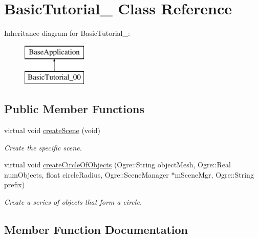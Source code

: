\hypertarget{class_basic_tutorial__00}{}\section{Basic\+Tutorial\+\_ Class Reference}
\label{class_basic_tutorial__00}
Inheritance diagram for Basic\+Tutorial\+\_\+:\begin{figure}[H]
\begin{center}
\leavevmode
\includegraphics[height=2.000000cm]{class_basic_tutorial__00}
\end{center}
\end{figure}
\subsection*{Public Member Functions}
\begin{DoxyCompactItemize}
\item 
virtual void \hyperlink{class_basic_tutorial__00_a15a3d4673724ec99077ce992f996a550}{create\+Scene} (void)
\begin{DoxyCompactList}\small\item\em Create the specific scene. \end{DoxyCompactList}\item 
virtual void \hyperlink{class_basic_tutorial__00_a84ba95a0d9c9388aa975cf97f19673f0}{create\+Circle\+Of\+Objects} (Ogre\+::\+String object\+Mesh, Ogre\+::\+Real num\+Objects, float circle\+Radius, Ogre\+::\+Scene\+Manager $\ast$m\+Scene\+Mgr, Ogre\+::\+String prefix)
\begin{DoxyCompactList}\small\item\em Create a series of objects that form a circle. \end{DoxyCompactList}\end{DoxyCompactItemize}


\subsection{Member Function Documentation}
\hypertarget{class_basic_tutorial__00_a84ba95a0d9c9388aa975cf97f19673f0}{}\label{class_basic_tutorial__00_a84ba95a0d9c9388aa975cf97f19673f0} 
